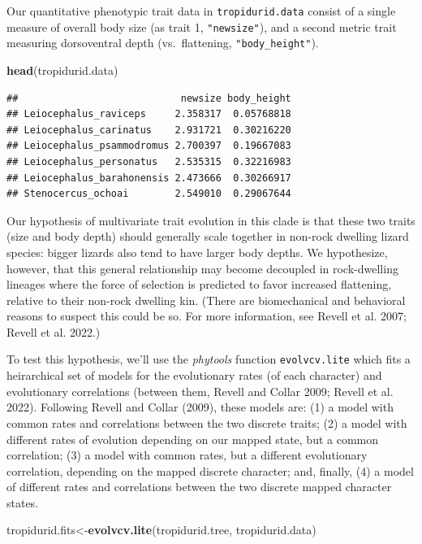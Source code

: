 \documentclass[fleqn,10pt,lineno]{wlpeerj} %
\newenvironment{Shaded}{\begin{snugshade}}{\end{snugshade}}
\newcommand{\FunctionTok}[1]{\textcolor[rgb]{0.13,0.29,0.53}{\textbf{#1}}}
\newcommand{\NormalTok}[1]{#1}
\newcommand{\OtherTok}[1]{\textcolor[rgb]{0.56,0.35,0.01}{#1}}
\begin{document}
Our quantitative phenotypic trait data in \texttt{tropidurid.data} consist of a single measure of overall body size (as trait 1, \texttt{"newsize"}), and a second metric trait measuring dorsoventral depth (vs.~flattening, \texttt{"body\_height"}).

\begin{Shaded}
\begin{Highlighting}[]
\FunctionTok{head}\NormalTok{(tropidurid.data)}
\end{Highlighting}
\end{Shaded}

\begin{verbatim}
##                            newsize body_height
## Leiocephalus_raviceps     2.358317  0.05768818
## Leiocephalus_carinatus    2.931721  0.30216220
## Leiocephalus_psammodromus 2.700397  0.19667083
## Leiocephalus_personatus   2.535315  0.32216983
## Leiocephalus_barahonensis 2.473666  0.30266917
## Stenocercus_ochoai        2.549010  0.29067644
\end{verbatim}

Our hypothesis of multivariate trait evolution in this clade is that these two traits (size and body depth) should generally scale together in non-rock dwelling lizard species: bigger lizards also tend to have larger body depths. We hypothesize, however, that this general relationship may become decoupled in rock-dwelling lineages where the force of selection is predicted to favor increased flattening, relative to their non-rock dwelling kin. (There are biomechanical and behavioral reasons to suspect this could be so. For more information, see Revell et al. 2007; Revell et al. 2022.)

To test this hypothesis, we'll use the \emph{phytools} function \texttt{evolvcv.lite} which fits a heirarchical set of models for the evolutionary rates (of each character) and evolutionary correlations (between them, Revell and Collar 2009; Revell et al. 2022). Following Revell and Collar (2009), these models are: (1) a model with common rates and correlations between the two discrete traits; (2) a model with different rates of evolution depending on our mapped state, but a common correlation; (3) a model with common rates, but a different evolutionary correlation, depending on the mapped discrete character; and, finally, (4) a model of different rates and correlations between the two discrete mapped character states.

\begin{Shaded}
\begin{Highlighting}[]
\NormalTok{tropidurid.fits}\OtherTok{\textless{}{-}}\FunctionTok{evolvcv.lite}\NormalTok{(tropidurid.tree,}
\NormalTok{  tropidurid.data)}
\end{Highlighting}
\end{Shaded}
\end{document}
